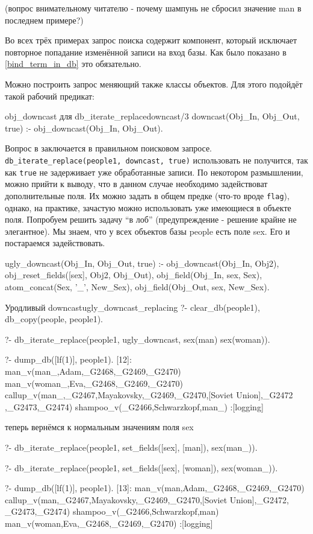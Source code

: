 \documentclass[a4paper]{book}
\begin{document}
(вопрос внимательному читателю - почему шампунь не сбросил
значение man в последнем примере?)

Во всех трёх примерах запрос поиска содержит компонент, который
исключает повторное попадание изменённой записи на вход базы. Как
было показано в \ref{bind_term_in_db} это обязательно.

Можно построить запрос меняющий также классы объектов. Для этого
подойдёт такой рабочий предикат:

\begin{example}{obj_downcast для db_iterate_replace}{downcast/3}
downcast(Obj_In, Obj_Out, true) :- obj_downcast(Obj_In, Obj_Out).
\end{example}

Вопрос в заключается в правильном поисковом
запросе. \verb|db_iterate_replace(people1, downcast, true)|
использовать не получится, так как \verb|true| не задерживает уже
обработанные записи. По некотором размышлении, можно прийти к
выводу, что в данном случае необходимо задействоват
дополнительные поля. Их можно задать в общем предке (что-то вроде
\verb|flag|), однако, на практике, зачастую можно использовать
уже имеющиеся в объекте поля. Попробуем решить задачу ``в лоб''
(предупреждение - решение крайне не элегантное). Мы знаем, что у
всех объектов базы people есть поле sex. Его и постараемся
задействовать.

\begin{example}{}{}
ugly_downcast(Obj_In, Obj_Out, true) :- 
   obj_downcast(Obj_In, Obj2),
   obj_reset_fields([sex], Obj2, Obj_Out),
   obj_field(Obj_In, sex, Sex),
   atom_concat(Sex, '_', New_Sex),
   obj_field(Obj_Out, sex, New_Sex).
\end{example}

\begin{example}{Уродливый downcast}{ugly_downcast_replacing}
?- clear_db(people1), db_copy(people, people1).

?- db_iterate_replace(people1, 
      ugly_downcast, sex(man) \/ sex(woman)).

?- dump_db([lf(1)], people1).
[12]: man_v(man_,Adam,_G2468,_G2469,_G2470) 
man_v(woman_,Eva,_G2468,_G2469,_G2470) 
callup_v(man_,_G2467,Mayakovsky,_G2469,_G2470,[Soviet Union],_G2472
,_G2473,_G2474)                                                   
shampoo_v(_G2466,Schwarzkopf,man_) 
 :[logging]
\end{example}

теперь вернёмся к нормальным значениям поля sex

\begin{example}{}{}
?- db_iterate_replace(people1, 
      set_fields([sex], [man]), sex(man_)).

?- db_iterate_replace(people1, 
      set_fields([sex], [woman]), sex(woman_)).

?- dump_db([lf(1)], people1).
[13]: man_v(man,Adam,_G2468,_G2469,_G2470) 
callup_v(man,_G2467,Mayakovsky,_G2469,_G2470,[Soviet Union],_G2472,
_G2473,_G2474)                                                    
shampoo_v(_G2466,Schwarzkopf,man) 
man_v(woman,Eva,_G2468,_G2469,_G2470) 
 :[logging]
\end{example}
\end{document}
